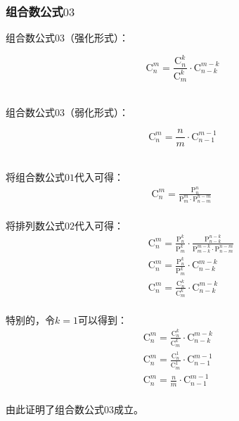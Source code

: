\documentclass[UTF8]{ctexart}
\newcommand{\Pe}{\mathrm{P}}
\newcommand{\Co}{\mathrm{C}}
\begin{document}
\subsubsection{组合数公式$03$}
    组合数公式$03$（强化形式）：
    \begin{large}
        \begin{equation*}
            \Co_n^m=\frac{\Co_n^k}{\Co_m^k}\cdot\Co_{n-k}^{m-k}
        \end{equation*}
    \end{large}\\
    组合数公式$03$（弱化形式）：
    \begin{large}
        \begin{equation*}
            \Co_n^m=\frac{n}{m}\cdot\Co_{n-1}^{m-1}
        \end{equation*}
    \end{large}\\
    将组合数公式$01$代入可得：
    \setcounter{equation}{0}
    \begin{align}
        \Co_n^m=\frac{\Pe_n^n}{\Pe_m^m\cdot\Pe_{n-m}^{n-m}}~
    \end{align}\\
    将排列数公式$02$代入可得：
    \begin{align}
        &~~~~\Co_n^m=\frac{\Pe_n^k}{\Pe_m^k}\cdot\frac{\Pe_{n-k}^{n-k}}{\Pe_{m-k}^{m-k}\cdot\Pe_{n-m}^{n-m}}\\[3mm]
        &~~~~\Co_n^m=\frac{\Pe_n^k}{\Pe_m^k}\cdot\Co_{n-k}^{m-k}\\[3mm]
        &~~~~\Co_n^m=\frac{\Co_n^k}{\Co_m^k}\cdot\Co_{n-k}^{m-k}
    \end{align}\\
    特别的，令$k=1$可以得到：
    \begin{align}
        &\Co_n^m=\frac{\Co_n^k}{\Co_m^k}\cdot\Co_{n-k}^{m-k}~~~~~~~~\\[3mm]
        &\Co_n^m=\frac{\Co_n^1}{\Co_m^1}\cdot\Co_{n-1}^{m-1}\\[3mm]
        &\Co_n^m=\frac{n}{m}\cdot\Co_{n-1}^{m-1}
    \end{align}\\
    由此证明了组合数公式$03$成立。

\newpage
\end{document}
